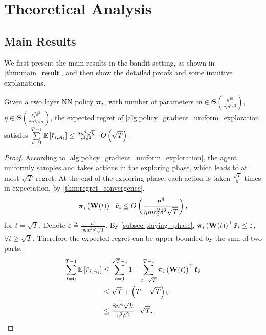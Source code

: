 \section{Theoretical Analysis}

\subsection{Main Results}
\label{subsec:main_results}

We first present the main results in the bandit setting, as shown in \cref{thm:main_result}, and then show the detailed proofs and some intuitive explanations.

\begin{thm}
\label{thm:main_result}
    Given a two layer NN policy ${\boldsymbol{\pi}}_i$, with number of parameters $m \in \Theta\left( \frac{n^{10}}{c_t^4 \delta^4 \varepsilon^2} \right)$, $\eta \in \Theta\left( \frac{c_t^2 \delta^2}{8 n^4 h m} \right)$, the expected regret of \cref{alg:policy_gradient_uniform_exploration} satisfies $\sum\limits_{t=0}^{T-1}{ {\mathbb{E}} \left[ \tilde{r}_{i, A_t} \right] } \le  \frac{8 n^4 \sqrt{h}}{c^2 \delta^2} \cdot O\left( \sqrt{T} \right)$.
\end{thm}
\begin{proof}
According to \cref{alg:policy_gradient_uniform_exploration}, the agent uniformly samples and takes actions in the exploring phase, which leads to at most $\sqrt{T}$ regret. At the end of the exploring phase, each action is taken $\frac{\sqrt{T}}{h}$ times in expectation, by \cref{thm:regret_convergence}, 
\begin{equation*}
\begin{split}
    {\boldsymbol{\pi}}_i\left( {\mathbf{W}}(t) \right)^\top {\tilde{\mathbf{r}}}_i \le O\left( \frac{n^4}{\eta m c_t^2 \delta^2 \sqrt{T}} \right),
\end{split}
\end{equation*}
for $t = \sqrt{T}$. Denote $\varepsilon \triangleq \frac{n^4}{\eta m c^2 \delta^2 \sqrt{T}}$. By \cref{subsec:playing_phase}, ${\boldsymbol{\pi}}_i\left( {\mathbf{W}}(t) \right)^\top {\tilde{\mathbf{r}}}_i \le \varepsilon$, $\forall t \ge \sqrt{T}$. Therefore the expected regret can be upper bounded by the sum of two parts,
\begin{equation*}
\begin{split}
    \sum\limits_{t=0}^{T-1}{ {\mathbb{E}} \left[ \tilde{r}_{i, A_t} \right] } &\le \sum\limits_{t=0}^{\sqrt{T}-1}{ 1 } + \sum\limits_{t=\sqrt{T}}^{T-1}{ {\boldsymbol{\pi}}_i\left( {\mathbf{W}}(t) \right)^\top {\tilde{\mathbf{r}}}_i } \\
    &\le \sqrt{T} + \left( T - \sqrt{T} \right) \varepsilon \\
    &\le \frac{8 n^4 \sqrt{h}}{c^2 \delta^2} \cdot \sqrt{T}. \qedhere
\end{split}
\end{equation*}
\end{proof}

